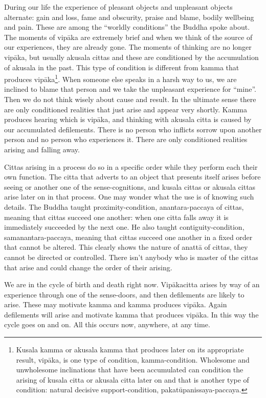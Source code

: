 During our life the experience of pleasant objects and unpleasant
objects alternate: gain and loss, fame and obscurity, praise and blame,
bodily wellbeing and pain. These are among the ``worldly conditions''
the Buddha spoke about. The moments of vipāka are extremely brief and
when we think of the source of our experiences, they are already gone.
The moments of thinking are no longer vipāka, but usually akusala cittas
and these are conditioned by the accumulation of akusala in the past.
This type of condition is different from kamma that produces
vipāka\footnote{Kusala kamma or akusala
kamma that produces later on its appropriate result, vipāka, is one type
of condition, kamma-condition. Wholesome and unwholesome inclinations
that have been accumulated can condition the arising of kusala citta or
akusala citta later on and that is another type of condition: natural
decisive support-condition, pakatūpanissaya-paccaya.}. When someone else
speaks in a harsh way to us, we are inclined to blame that person and we
take the unpleasant experience for ``mine''. Then we do not think wisely
about cause and result. In the ultimate sense there are only conditioned
realities that just arise and appear very shortly. Kamma produces
hearing which is vipāka, and thinking with akusala citta is caused by
our accumulated defilements. There is no person who inflicts sorrow upon
another person and no person who experiences it. There are only
conditioned realities arising and falling away.

Cittas arising in a process do so in a specific order while they perform
each their own function. The citta that adverts to an object that
presents itself arises before seeing or another one of the
sense-cognitions, and kusala cittas or akusala cittas arise later on in
that process. One may wonder what the use is of knowing such details.
The Buddha taught proximity-condition, anantara-paccaya of cittas,
meaning that cittas succeed one another: when one citta falls away it is
immediately succeeded by the next one. He also taught
contiguity-condition, samanantara-paccaya, meaning that cittas succeed
one another in a fixed order that cannot be altered. This clearly shows
the nature of anattā of cittas, they cannot be directed or controlled.
There isn't anybody who is master of the cittas that arise and could
change the order of their arising.

We are in the cycle of birth and death right now. Vipākacitta arises by
way of an experience through one of the sense-doors, and then
defilements are likely to arise. These may motivate kamma and kamma
produces vipāka. Again defilements will arise and motivate kamma that
produces vipāka. In this way the cycle goes on and on. All this occurs
now, anywhere, at any time.

